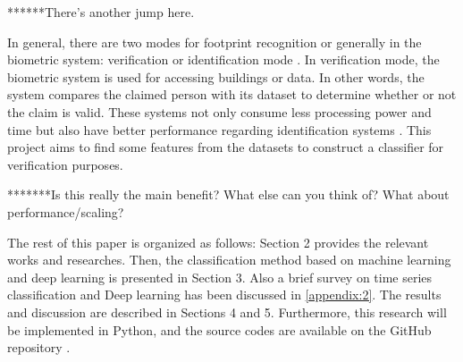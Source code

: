 ******There's another jump here. 

In general, there are two modes for footprint recognition or generally in the biometric system: verification or identification mode \cite{Jain2004AnRecognition}. In verification mode, the biometric system is used for accessing buildings or data. In other words, the system compares the claimed person with its dataset to determine whether or not the claim is valid. These systems not only consume less processing power and time but also have better performance regarding identification systems \cite{Jain2004AnRecognition}. This project aims to find some features from the datasets to construct a classifier for verification purposes. 

*******Is this really the main benefit?  What else can you think of?  What about performance/scaling?



 

The rest of this paper is organized as follows: Section 2 provides the relevant works and researches. Then,%
 the classification method based on machine learning and deep learning is presented in Section 3. Also a brief survey on time series classification and Deep learning has been discussed in \ref{appendix:2}. The results and discussion are described in Sections 4 and 5.
Furthermore, this research will be implemented in Python, and the source codes are available on the GitHub repository \cite{SKazemii/EE6563}. 

